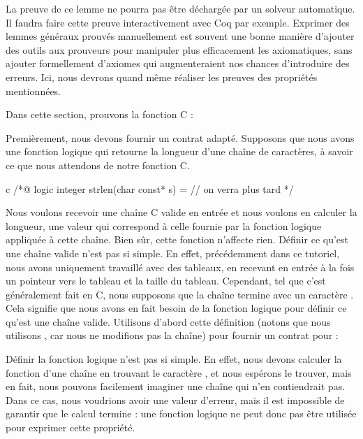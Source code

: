 La preuve de ce lemme ne pourra pas être déchargée par un solveur automatique. Il
faudra faire cette preuve interactivement avec Coq par exemple. Exprimer des
lemmes généraux prouvés manuellement est souvent une bonne manière d'ajouter des
outils aux prouveurs pour manipuler plus efficacement les axiomatiques, sans
ajouter formellement d'axiomes qui augmenteraient nos chances d'introduire des
erreurs. Ici, nous devrons quand même réaliser les preuves des propriétés
mentionnées.




Dans cette section, prouvons la fonction C  :




Premièrement, nous devons fournir un contrat adapté. Supposons que nous avons
une fonction logique  qui retourne la longueur d'une chaîne
de caractères, à savoir ce que nous attendons de notre fonction C.


\begin{CodeBlock}{c}
/*@
  logic integer strlen(char const* s) = // on verra plus tard
*/
\end{CodeBlock}


Nous voulons recevoir une chaîne C valide en entrée et nous voulons en
calculer la longueur, une valeur qui correspond à celle fournie par la
fonction logique  appliquée à cette chaîne. Bien sûr,
cette fonction n'affecte rien. Définir ce qu'est une chaîne valide n'est
pas si simple. En effet, précédemment dans ce tutoriel, nous avons uniquement
travaillé avec des tableaux, en recevant en entrée à la fois un pointeur
vers le tableau et la taille du tableau. Cependant, tel que
c'est généralement fait en C, nous supposons que la chaîne termine avec
un caractère . Cela signifie que nous
avons en fait besoin de la fonction logique  pour
définir ce qu'est une chaîne valide. Utilisons d'abord cette définition
(notons que nous utilisons ,
car nous ne modifions pas la chaîne) pour fournir un contrat pour
 :





Définir la fonction logique  n'est pas si simple. En effet,
nous devons calculer la fonction d'une chaîne en trouvant le caractère
, et nous espérons le trouver, mais en fait,
nous pouvons facilement imaginer une chaîne qui n'en contiendrait pas. Dans
ce cas, nous voudrions avoir une valeur d'erreur, mais il est impossible de
garantir que le calcul termine : une fonction logique ne peut donc pas être
utilisée pour exprimer cette propriété.



